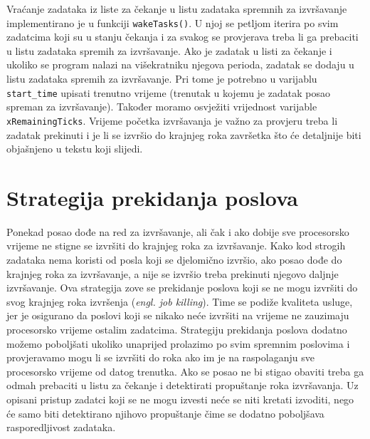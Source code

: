 \documentclass[../zavrsni.tex]{subfiles}
\begin{document}



Vraćanje zadataka iz liste za čekanje u listu zadataka spremnih za izvršavanje implementirano je u funkciji \texttt{wakeTasks()}.
U njoj se petljom iterira po svim zadatcima koji su u stanju čekanja i za svakog se provjerava treba li ga prebaciti u listu zadataka 
spremih za izvršavanje.
Ako je zadatak u listi za čekanje i ukoliko se program nalazi na višekratniku njegova perioda, zadatak se dodaju u listu 
zadataka spremih za izvršavanje. Pri tome je potrebno u varijablu \texttt{start\_time} upisati trenutno vrijeme (trenutak u kojemu je 
zadatak posao spreman za izvršavanje). Također moramo osvježiti vrijednost varijable \texttt{xRemainingTicks}. 
Vrijeme početka izvršavanja je važno za provjeru treba li zadatak prekinuti i je li se izvršio do krajnjeg roka završetka 
što će detaljnije biti objašnjeno u tekstu koji slijedi.


\section{Strategija prekidanja poslova}

Ponekad posao dođe na red za izvršavanje, ali čak i ako dobije sve procesorsko vrijeme ne stigne se izvršiti do krajnjeg roka za izvršavanje.
Kako kod strogih zadataka nema koristi od posla koji se djelomično izvršio, ako posao dođe do krajnjeg roka za izvršavanje, a nije se izvršio
 treba prekinuti njegovo daljnje izvršavanje. Ova strategija zove se prekidanje poslova koji se ne mogu izvršiti do svog 
 krajnjeg roka izvršenja (\textit{engl. job killing}). Time se podiže kvaliteta usluge, jer je osigurano da poslovi koji se nikako neće 
 izvršiti na vrijeme ne zauzimaju procesorsko vrijeme ostalim zadatcima. Strategiju prekidanja poslova dodatno možemo poboljšati
 ukoliko unaprijed prolazimo po svim spremnim poslovima i provjeravamo mogu li se izvršiti do roka ako im je na raspolaganju sve 
 procesorsko vrijeme od datog trenutka. Ako se posao ne bi stigao obaviti treba ga odmah prebaciti u listu za čekanje i detektirati 
 propuštanje roka izvršavanja. Uz opisani pristup zadatci koji se ne mogu izvesti neće se niti kretati izvoditi, nego će samo
 biti detektirano njihovo propuštanje čime se dodatno poboljšava rasporedljivost zadataka.
\end{document}
